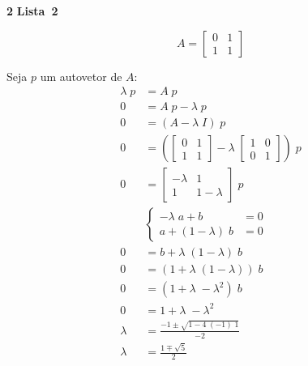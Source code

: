 \documentclass{article}
\newcounter{exe-list}
\newenvironment{exe-list}
    {\begin{list}{(\alph{exe-list})}{\usecounter{exe-list}}}
    {\end{list}}
\newenvironment{exe}[2][Sala]
    {\bigskip\noindent\par\ifthenelse{\equal{#1}{}}%
        {\textbf{\LARGE #2}}%
        {\textbf{\LARGE #1~#2}}%
    \medskip\noindent\par}
    {\bigskip}
\begin{document}
\begin{exe}[Lista]{2}
    \begin{exe-list}
        \item
            \[
                A = \begin{bmatrix}
                    0 & 1 \\
                    1 & 1
                \end{bmatrix}
            \]
        \item
            Seja \(p\) um autovetor de \(A\):
            \begin{align*}
                \lambda \; p &= A \; p \\
                0 &= A \; p - \lambda \; p \\
                0 &= (A - \lambda \; I) \; p \\
                0 &= \left(\begin{bmatrix}
                    0 & 1 \\
                    1 & 1
                \end{bmatrix} - \lambda \; \begin{bmatrix}
                    1 & 0 \\
                    0 & 1
                \end{bmatrix}\right) \; p \\
                0 &= \begin{bmatrix}
                    - \lambda & 1 \\
                    1 & 1 - \lambda
                \end{bmatrix} \; p \\
                &\begin{cases}
                    - \lambda \; a + b &= 0 \\
                    a + (1 - \lambda) \; b &= 0
                \end{cases} \\
                0 &= b + \lambda \; (1 - \lambda) \; b \\
                0 &= (1 + \lambda \; (1 - \lambda)) \; b \\
                0 &= (1 + \lambda \; - \lambda^2) \; b \\
                0 &= 1 + \lambda \; - \lambda^2 \\
                \lambda &= \frac{-1 \pm \sqrt{1 - 4 \; (-1) \; 1}}{-2} \\
                \lambda &= \frac{1 \mp \sqrt{5}}{2}
            \end{align*}


\end{exe-list}
\end{exe}
\end{document}

